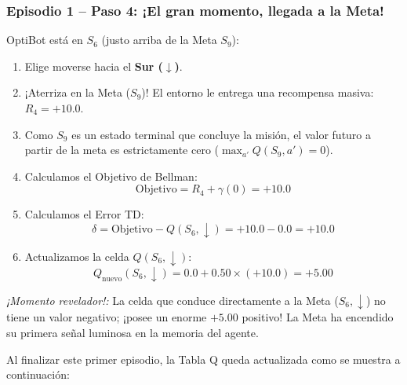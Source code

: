 \begin{calculomanual}
\subsubsection*{Episodio 1 -- Paso 4: ¡El gran momento, llegada a la Meta!}
OptiBot está en $S_6$ (justo arriba de la Meta $S_9$):
\begin{enumerate}
  \item Elige moverse hacia el \textbf{Sur ($\downarrow$)}.
  \item ¡Aterriza en la Meta ($S_9$)! El entorno le entrega una recompensa masiva: $R_4 = \mathbf{+10.0}$.
  \item Como $S_9$ es un estado terminal que concluye la misión, el valor futuro a partir de la meta es estrictamente cero ($\max_{a'} Q(S_9, a') = 0$).
  \item Calculamos el Objetivo de Bellman:
  \[
    \text{Objetivo} = R_4 + \gamma (0) = \mathbf{+10.0}
  \]
  \item Calculamos el Error TD:
  \[
    \delta = \text{Objetivo} - Q(S_6, \downarrow) = +10.0 - 0.0 = \mathbf{+10.0}
  \]
  \item Actualizamos la celda $Q(S_6, \downarrow)$:
  \[
    Q_{\text{nuevo}}(S_6, \downarrow) = 0.0 + 0.50 \times (+10.0) = \mathbf{+5.00}
  \]
\end{enumerate}

\textit{¡Momento revelador!:} La celda que conduce directamente a la Meta ($S_6, \downarrow$) no tiene un valor negativo; ¡posee un enorme $+5.00$ positivo! La Meta ha encendido su primera señal luminosa en la memoria del agente.

Al finalizar este primer episodio, la Tabla Q queda actualizada como se muestra a continuación:


\end{calculomanual}
